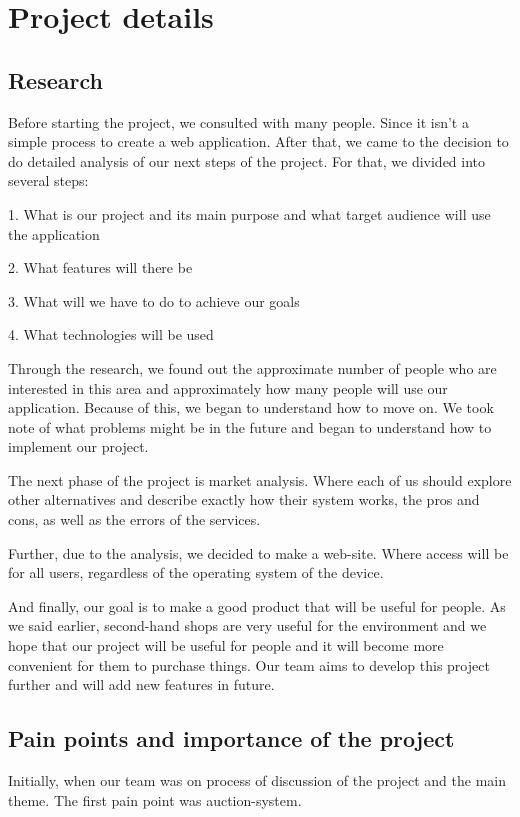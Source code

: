 \chapter{Project details}\label{ch:A}
\section{Research}
Before starting the project, we consulted with many people. Since it isn't a simple process to create a web application. After that, we came to the decision to do detailed analysis of our next steps of the project. For that, we divided into several steps:
    
    1. What is our project and its main purpose and what target audience will use the application
    
    2. What features will there be 

    3. What will we have to do to achieve our goals

    4. What technologies will be used

Through the research, we found out the approximate number of people who are interested in this area and approximately how many people will use our application. Because of this, we began to understand how to move on. We took note of what problems might be in the future and began to understand how to implement our project.

The next phase of the project is market analysis. Where each of us should explore other alternatives and describe exactly how their system works, the pros and cons, as well as the errors of the services.

Further, due to the analysis, we decided to make a web-site. Where access will be for all users, regardless of the operating system of the device.

And finally, our goal is to make a good product that will be useful for people. As we said earlier, second-hand shops are very useful for the environment and we hope that our project will be useful for people and it will become more convenient for them to purchase things. Our team aims to develop this project further and will add new features in future.

\section{Pain points and importance of the project}
Initially, when our team was on process of discussion of the project and the main theme. The first pain point was auction-system.

